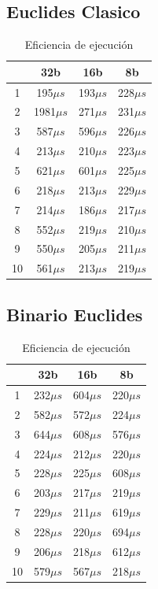 \subsection{Euclides Clasico}
\begin{table}[H]
\label{tablax}
\begin{center}
\begin{tabular}{|c|c|c|c|}
\hline 
 &32b&16b&8b \\
\hline
1 & 195$\mu s$ & 193$\mu s$ & 228$\mu s$ \\ \hline
2& 1981$\mu s$& 271$\mu s$ & 231$\mu s$ \\ \hline
3& 587$\mu s$ & 596$\mu s$ & 226$\mu s$ \\ \hline
4& 213$\mu s$ & 210$\mu s$ & 223$\mu s$ \\ \hline
5& 621$\mu s$ & 601$\mu s$ & 225$\mu s$ \\ \hline
6& 218$\mu s$ & 213$\mu s$ & 229$\mu s$ \\ \hline
7& 214$\mu s$ & 186$\mu s$ & 217$\mu s$ \\ \hline
8& 552$\mu s$ & 219$\mu s$ & 210$\mu s$ \\ \hline
9& 550$\mu s$ & 205$\mu s$ & 211$\mu s$ \\ \hline
10& 561$\mu s$ & 213$\mu s$ & 219$\mu s$ \\ \hline
\end{tabular}
\end{center}
\caption{Eficiencia de ejecuci\'on}
\end{table}

\subsection{Binario Euclides}
\begin{table}[H]
\label{tablax}
\begin{center}
\begin{tabular}{|c|c|c|c|}
\hline 
 &32b&16b&8b \\
\hline
1 & 232$\mu s$ & 604$\mu s$ & 220$\mu s$ \\ \hline
2& 582$\mu s$& 572$\mu s$ & 224$\mu s$ \\ \hline
3& 644$\mu s$ & 608$\mu s$ & 576$\mu s$ \\ \hline
4& 224$\mu s$ & 212$\mu s$ & 220$\mu s$ \\ \hline
5& 228$\mu s$ & 225$\mu s$ & 608$\mu s$ \\ \hline
6& 203$\mu s$ & 217$\mu s$ & 219$\mu s$ \\ \hline
7& 229$\mu s$ & 211$\mu s$ & 619$\mu s$ \\ \hline
8& 228$\mu s$ & 220$\mu s$ & 694$\mu s$ \\ \hline
9& 206$\mu s$ & 218$\mu s$ & 612$\mu s$ \\ \hline
10& 579$\mu s$ & 567$\mu s$ & 218$\mu s$ \\ \hline
\end{tabular}
\end{center}
\caption{Eficiencia de ejecuci\'on}
\end{table}

